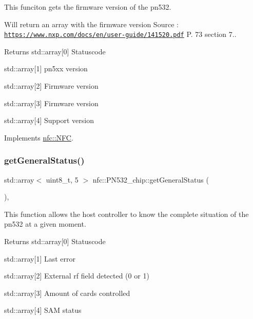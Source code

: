 This funciton gets the firmware version of the pn532. 

Will return an array with the firmware version Source \+: \href{https://www.nxp.com/docs/en/user-guide/141520.pdf}{\tt https\+://www.\+nxp.\+com/docs/en/user-\/guide/141520.\+pdf} P. 73 section 7.. \begin{DoxyReturn}{Returns}
std\+::array\mbox{[}0\mbox{]} Statuscode 

std\+::array\mbox{[}1\mbox{]} pn5xx version 

std\+::array\mbox{[}2\mbox{]} Firmware version 

std\+::array\mbox{[}3\mbox{]} Firmware version 

std\+::array\mbox{[}4\mbox{]} Support version 
\end{DoxyReturn}


Implements \hyperlink{classnfc_1_1NFC_a25a4f9824ac567c8ca37ea3486d32882}{nfc\+::\+N\+FC}.

\mbox{\label{classnfc_1_1PN532__chip_a9ffef9f3b2982346499703361c6e7d5c}} 
\subsubsection{\texorpdfstring{get\+General\+Status()}{getGeneralStatus()}}
{\footnotesize\ttfamily std\+::array$<$ uint8\+\_\+t, 5 $>$ nfc\+::\+P\+N532\+\_\+chip\+::get\+General\+Status (\begin{DoxyParamCaption}{ }\end{DoxyParamCaption})\hspace{0.3cm}{\ttfamily [override]}, {\ttfamily [virtual]}}



This function allows the host controller to know the complete situation of the pn532 at a given moment. 

\begin{DoxyReturn}{Returns}
std\+::array\mbox{[}0\mbox{]} Statuscode 

std\+::array\mbox{[}1\mbox{]} Last error 

std\+::array\mbox{[}2\mbox{]} External rf field detected (0 or 1) 

std\+::array\mbox{[}3\mbox{]} Amount of cards controlled 

std\+::array\mbox{[}4\mbox{]} S\+AM status 
\end{DoxyReturn}


